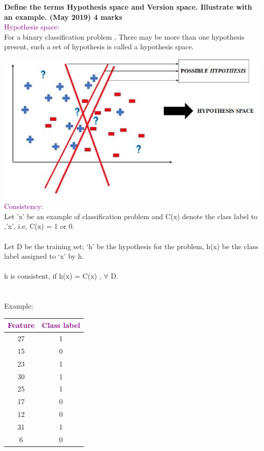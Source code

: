 
\textbf{\textcolor{LightMagenta}{Define the terms Hypothesis space and Version space. Illustrate with an 
example. (May 2019) \hfill 4 marks}}
\\[5pt]
{\textcolor{purple}{Hypothesis space:}}\\
For a binary classification problem , There may be more than one hypothesis present, such a set of hypothesis is called a hypothesis space.\\


\graphicspath{ {./} }
\includegraphics{Images/A23_img1.JPG}\\
{\textcolor{purple}{Consistency:}}\\
Let 'x' be an example of classification problem and C(x) denote the class label to ,'x', i.e, C(x) = 1 or 0.\\
\\
Let  D be the training set; ‘h’ be the hypothesis for the problem, h(x) be the class label assigned to ‘x’ by h.\\
\\
h is consistent, if h(x) = C(x) , $\forall$ D.\\
\\
\\
Example:
 \begin{table}[h]                           
 \centering
    \begin{tabular}{|c|c|}
    \hline
  \textcolor{purple}{Feature}   &    \textcolor{purple}{Class label}            \\ \hline
     27     &  1     \\ \hline          
     15     &  0 \\ \hline
     23     &  1   \\ \hline
     30     &  1    \\ \hline
     25     &  1  \\ \hline
     17     &  0   \\ \hline
     12     &  0 \\ \hline
     31     &  1     \\ \hline
     6      &  0   \\ \hline

    \end{tabular}
    \label{tab:msg1}                            

\end{table}\\
